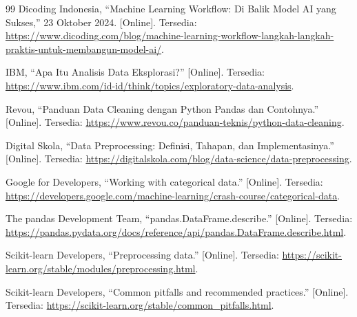 \documentclass[a4paper,oneside,12pt]{report}
\renewcommand{\bibname}{Daftar Pustaka}
\begin{document}
\clearpage
{}
\renewcommand{\bibname}{Daftar Pustaka}
\begin{thebibliography}{99}
     Dicoding Indonesia, ``Machine Learning Workflow: Di Balik Model AI yang Sukses,''
    23 Oktober 2024. [Online]. Tersedia:
    \url{https://www.dicoding.com/blog/machine-learning-workflow-langkah-langkah-praktis-untuk-membangun-model-ai/}.

     IBM, ``Apa Itu Analisis Data Eksplorasi?'' [Online]. Tersedia:
    \url{https://www.ibm.com/id-id/think/topics/exploratory-data-analysis}.

     Revou, ``Panduan Data Cleaning dengan Python Pandas dan Contohnya.'' [Online]. Tersedia:
    \url{https://www.revou.co/panduan-teknis/python-data-cleaning}.

     Digital Skola, ``Data Preprocessing: Definisi, Tahapan, dan Implementasinya.'' [Online]. Tersedia:
    \url{https://digitalskola.com/blog/data-science/data-preprocessing}.

     Google for Developers, ``Working with categorical data.'' [Online]. Tersedia:
    \url{https://developers.google.com/machine-learning/crash-course/categorical-data}.

     The pandas Development Team, ``pandas.DataFrame.describe.'' [Online]. Tersedia:
    \url{https://pandas.pydata.org/docs/reference/api/pandas.DataFrame.describe.html}.

     Scikit-learn Developers, ``Preprocessing data.'' [Online]. Tersedia:
    \url{https://scikit-learn.org/stable/modules/preprocessing.html}.

     Scikit-learn Developers, ``Common pitfalls and recommended practices.'' [Online]. Tersedia:
    \url{https://scikit-learn.org/stable/common_pitfalls.html}.
\end{thebibliography}
\end{document}
